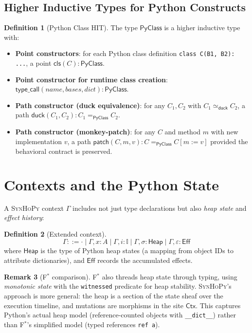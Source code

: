 \documentclass[11pt,a4paper]{report}
\theoremstyle{definition}
\newtheorem{definition}{Definition}[chapter]
\newtheorem{remark}[definition]{Remark}
\theoremstyle{plain}
\newcommand{\PyClass}{\mathsf{PyClass}}
\newcommand{\interval}{\mathbb{I}}
\newcommand{\Ctx}{\mathsf{Ctx}}
\newcommand{\Eff}{\mathsf{Eff}}
\newcommand{\fstar}{F$^{*}$}
\newcommand{\synhopy}{\textsc{SynHoPy}}
\begin{document}
\subsection{Higher Inductive Types for Python Constructs}

\begin{definition}[Python Class HIT]
\label{def:pyclass-hit}
The type $\PyClass$ is a higher inductive type with:
\begin{itemize}
  \item \textbf{Point constructors}: for each Python class definition
    \lstinline[style=python]{class C(B1, B2): ...}, a point $\mathsf{cls}(C) : \PyClass$.
  \item \textbf{Point constructor for runtime class creation}:
    $\mathsf{type\_call}(\mathit{name}, \mathit{bases}, \mathit{dict}) : \PyClass$.
  \item \textbf{Path constructor (duck equivalence)}: for any $C_1, C_2$ with
    $C_1 \simeq_{\mathsf{duck}} C_2$, a path $\mathsf{duck}(C_1, C_2) : C_1 =_{\PyClass} C_2$.
  \item \textbf{Path constructor (monkey-patch)}: for any $C$ and method $m$ with
    new implementation $v$, a path
    $\mathsf{patch}(C, m, v) : C =_{\PyClass} C[m := v]$
    provided the behavioral contract is preserved.
\end{itemize}
\end{definition}


\section{Contexts and the Python State}

A \synhopy{} context $\Gamma$ includes not just type declarations but also
\emph{heap state} and \emph{effect history}:

\begin{definition}[Extended context]
\[
  \Gamma ::= \cdot
    \mid \Gamma, x : A
    \mid \Gamma, i : \interval
    \mid \Gamma, \sigma : \mathsf{Heap}
    \mid \Gamma, \varepsilon : \Eff
\]
where $\mathsf{Heap}$ is the type of Python heap states (a mapping from
object IDs to attribute dictionaries), and $\Eff$ records the accumulated
effects.
\end{definition}

\begin{remark}[\fstar{} comparison]
\fstar{} also threads heap state through typing, using \emph{monotonic state}
with the \lstinline[style=fstar]{witnessed} predicate for heap stability. \synhopy{}'s approach
is more general: the heap is a section of the state sheaf over the execution
timeline, and mutations are morphisms in the site $\Ctx$. This captures Python's
actual heap model (reference-counted objects with {\tt \_\_dict\_\_}) rather than
\fstar{}'s simplified model (typed references \lstinline[style=fstar]{ref a}).
\end{remark}
\end{document}
